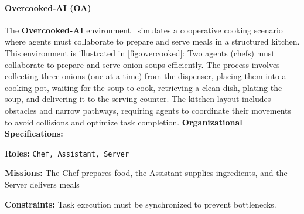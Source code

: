 \documentclass[pdflatex,sn-mathphys-num]{sn-jnl}%
\theoremstyle{thmstyleone}%
\theoremstyle{thmstyletwo}%
\theoremstyle{thmstylethree}%
\begin{document}
\paragraph*{Overcooked-AI (OA)}
The \textbf{Overcooked-AI} environment~\cite{Carroll2019} simulates a cooperative cooking scenario where agents must collaborate to prepare and serve meals in a structured kitchen. This environment is illustrated in \autoref{fig:overcooked}: Two agents (chefs) must collaborate to prepare and serve onion soups efficiently. The process involves collecting three onions (one at a time) from the dispenser, placing them into a cooking pot, waiting for the soup to cook, retrieving a clean dish, plating the soup, and delivering it to the serving counter. The kitchen layout includes obstacles and narrow pathways, requiring agents to coordinate their movements to avoid collisions and optimize task completion.
%
%
\textbf{Organizational Specifications:}
\begin{enumerate*}[label={\roman*)}, itemjoin={; \quad}]
    \item \textbf{Roles:} \texttt{Chef, Assistant, Server}
    \item \textbf{Missions:} The Chef prepares food, the Assistant supplies ingredients, and the Server delivers meals
    \item \textbf{Constraints:} Task execution must be synchronized to prevent bottlenecks.
\end{enumerate*}
\end{document}
